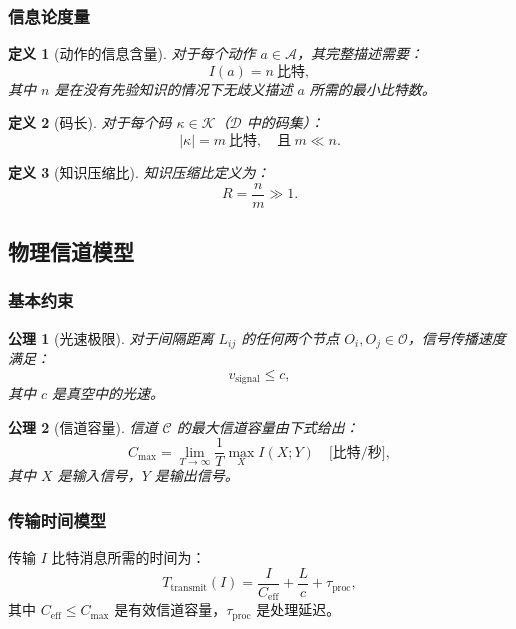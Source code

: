 \documentclass[12pt]{article}
\newtheorem{definition}{定义}
\newtheorem{axiom}{公理}
\begin{document}
	\subsubsection{信息论度量}
	
	\begin{definition}[动作的信息含量]
		对于每个动作 $a \in \mathcal{A}$，其完整描述需要：
		\[
		I(a) = n \ \text{比特},
		\]
		其中 $n$ 是在没有先验知识的情况下无歧义描述 $a$ 所需的最小比特数。
	\end{definition}
	
	\begin{definition}[码长]
		对于每个码 $\kappa \in \mathcal{K}$（$\mathcal{D}$ 中的码集）：
		\[
		|\kappa| = m \ \text{比特}, \quad \text{且} \ m \ll n.
		\]
	\end{definition}
	
	\begin{definition}[知识压缩比]
		知识压缩比定义为：
		\[
		R = \frac{n}{m} \gg 1.
		\]
	\end{definition}
	
	\subsection{物理信道模型}
	\label{app:channel-model}
	
	\subsubsection{基本约束}
	
	\begin{axiom}[光速极限]
		对于间隔距离 $L_{ij}$ 的任何两个节点 $O_i, O_j \in \mathcal{O}$，信号传播速度满足：
		\[
		v_{\text{signal}} \leq c,
		\]
		其中 $c$ 是真空中的光速。
	\end{axiom}
	
	\begin{axiom}[信道容量]
		信道 $\mathcal{C}$ 的最大信道容量由下式给出：
		\[
		C_{\text{max}} = \lim_{T \to \infty} \frac{1}{T} \max_{X} I(X; Y) \quad \text{[比特/秒]},
		\]
		其中 $X$ 是输入信号，$Y$ 是输出信号。
	\end{axiom}
	
	\subsubsection{传输时间模型}
	
	传输 $I$ 比特消息所需的时间为：
	\[
	T_{\text{transmit}}(I) = \frac{I}{C_{\text{eff}}} + \frac{L}{c} + \tau_{\text{proc}},
	\]
	其中 $C_{\text{eff}} \leq C_{\text{max}}$ 是有效信道容量，$\tau_{\text{proc}}$ 是处理延迟。
	
\end{document}
